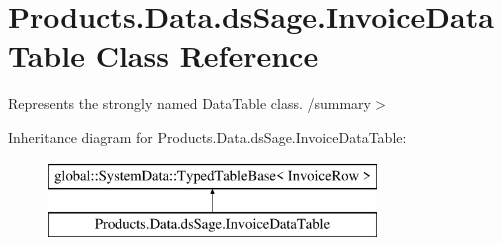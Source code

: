 \hypertarget{class_products_1_1_data_1_1ds_sage_1_1_invoice_data_table}{}\section{Products.\+Data.\+ds\+Sage.\+Invoice\+Data\+Table Class Reference}
\label{class_products_1_1_data_1_1ds_sage_1_1_invoice_data_table}


Represents the strongly named Data\+Table class. /summary$>$  


Inheritance diagram for Products.\+Data.\+ds\+Sage.\+Invoice\+Data\+Table\+:\begin{figure}[H]
\begin{center}
\leavevmode
\includegraphics[height=2.000000cm]{class_products_1_1_data_1_1ds_sage_1_1_invoice_data_table}
\end{center}
\end{figure}
